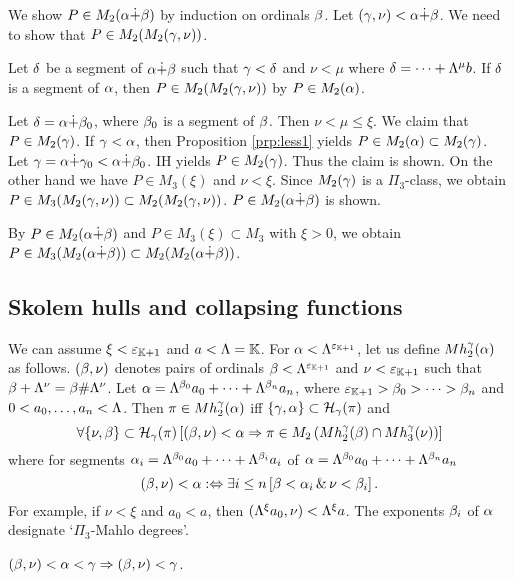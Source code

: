 \documentclass{article}
\newcommand{\mK}{\mathbb{K}}
\begin{document}
We show $P\in M_{2}(\alpha\dot{+}\beta)$ 
by induction on ordinals $\beta$.
Let $(\gamma,\nu)<\alpha\dot{+}\beta$.
We need to show that $P \in M_{2}(M_{2}(\gamma,\nu))$.

Let $\delta$ be a segment of $\alpha\dot{+}\beta$ such that
$\gamma<\delta$ and $\nu<\mu$ where
$\delta=\cdots+\Lambda^{\mu}b$.
If $\delta$ is a segment of $\alpha$, then $P\in M_{2}(M_{2}(\gamma,\nu))$
by $P\in M_{2}(\alpha)$.

Let
$\delta=\alpha\dot{+}\beta_{0}$, where $\beta_{0}$ is a segment of $\beta$.
Then $\nu<\mu\leq\xi$.
We claim that $P\in M_{2}(\gamma)$.
If $\gamma<\alpha$, then Proposition \ref{prp:less1} 
yields $P\in M_{2}(\alpha)\subset M_{2}(\gamma)$.
Let $\gamma=\alpha\dot{+}\gamma_{0}<\alpha\dot{+}\beta_{0}$.
IH yields $P\in M_{2}(\gamma)$.
Thus the claim is shown.
On the other hand we have $P\in M_{3}(\xi)$ and $\nu<\xi$.
Since $M_{2}(\gamma)$ is a $\Pi_{3}$-class, we obtain
$P\in M_{3}(M_{2}(\gamma,\nu))\subset M_{2}(M_{2}(\gamma,\nu))$.
$P\in M_{2}(\alpha\dot{+}\beta)$ is shown.

By $P\in M_{2}(\alpha\dot{+}\beta)$ and $P\in M_{3}(\xi)\subset M_{3}$ with $\xi>0$, 
we obtain $P\in M_{3}(M_{2}(\alpha\dot{+}\beta))\subset M_{2}(M_{2}(\alpha\dot{+}\beta))$.
\eprf

\subsection{Skolem hulls and collapsing functions}

We can assume $\xi<\veps_{\mK+1}$ and $a<\Lam=\mK$.
For $\alp<\Lam^{\veps_{\mK+1}}$, let us define $Mh_{2}^{\gamma}(\alpha)$ as follows.
$(\beta,\nu)$ denotes pairs of ordinals $\bet<\Lam^{\veps_{\mK+1}}$ and $\nu<\veps_{\mK+1}$
such that $\beta+\Lambda^{\nu}=\beta\#\Lambda^{\nu}$.
Let $\alpha=\Lambda^{\beta_{0}}a_{0}+\cdots+\Lambda^{\beta_{n}}a_{n}$, where
$\veps_{\mK+1}>\bet_{0}>\cdots>\bet_{n}$ and $0<a_{0},\ldots,a_{n}<\Lambda$.
Then $\pi\in Mh_{2}^{\gamma}(\alpha)$ iff 
$\{\gamma,\alpha\}\subset{\cal H}_{\gamma}(\pi)$ and 
\[
\forall \{\nu,\beta\}\subset{\cal H}_{\gamma}(\pi)\left[(\beta,\nu)< \alpha  \Rightarrow
\pi\in M_{2}\left(
Mh_{2}^{\gamma}(\beta)\cap Mh_{3}^{\gamma}(\nu)
\right)
\right]
\]
where for segments $\alpha_{i}=\Lambda^{\beta_{0}}a_{0}+\cdots+\Lambda^{\beta_{i}}a_{i}$ of 
$\alpha=\Lambda^{\beta_{0}}a_{0}+\cdots+\Lambda^{\beta_{n}}a_{n}$
\[
(\beta,\nu)< \alpha :\Leftrightarrow \exists i\leq n\left[
\beta<\alpha_{i} \,\&\, \nu<\beta_{i}
\right]
.\]
For example, if $\nu<\xi$ and $a_{0}<a$, then $(\Lambda^{\xi}a_{0},\nu)<\Lambda^{\xi}a$.
The exponents $\beta_{i}$ of $\alpha$ designate `$\Pi_{3}$-Mahlo degrees'.

\bprp\label{prp:less}
$(\beta,\nu)<\alpha<\gamma \Rightarrow (\beta,\nu)<\gamma$.
\eprp
\end{document}
